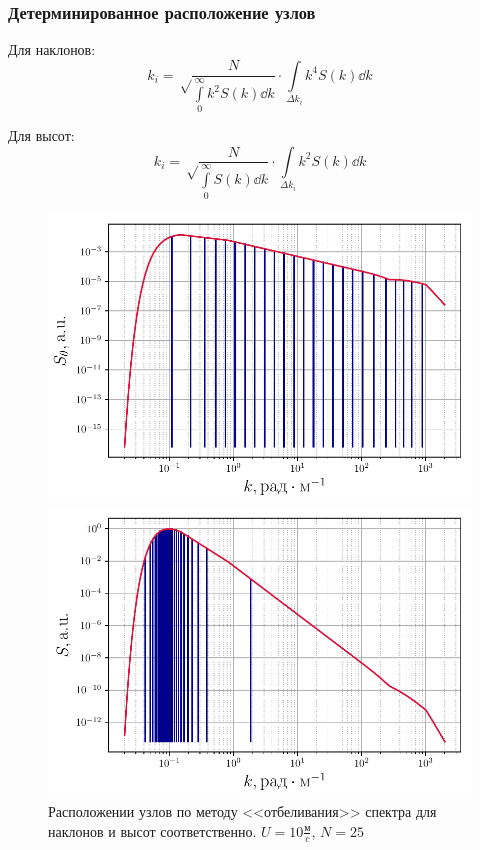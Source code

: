 \documentclass[10pt,pdf,hyperref={unicode}, dvipsnames]{beamer}
\begin{document}
\begin{frame}[t]\frametitle{Детерминированное расположение узлов}
    

\begin{minipage}{0.49\linewidth}
\centering Для наклонов:
\begin{equation*}
	k_i=\sqrt\frac{N}{{\int\limits_{0}^{\infty} k^2 S(k) \dd{k}}}\cdot {\int\limits_{\Delta k_i} k^4 S(k) \dd{k}}
	\label{eq:ki}
\end{equation*}
\end{minipage}
\hfill
\begin{minipage}{0.49\linewidth}
\centering Для высот:
	\begin{equation*}
	k_i=\sqrt\frac{N}{{\int\limits_{0}^{\infty} S(k) \dd{k}}}\cdot \int\limits_{\Delta k_i} k^2 S(k) \dd{k}
	\label{eq:ki}
\end{equation*}
\end{minipage}
\vfill
\begin{figure}[H]
	\begin{minipage}{0.49\linewidth}
			\centering
			\includegraphics[width=\linewidth]{fig/split_angles}	
	\end{minipage}
	\hfill
	\begin{minipage}{0.49\linewidth}
			\centering
			\includegraphics[width=\linewidth]{fig/split_height}
	\end{minipage}
	\caption{Расположении узлов по методу <<отбеливания>> спектра  для наклонов и высот соответственно. $U=10 \frac{\text{м}}{c}$, $N=25$}
	\label{fig:splits}		
\end{figure}


\end{frame}
\end{document}
